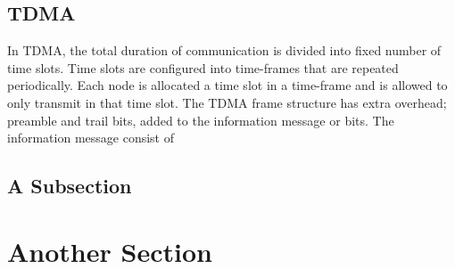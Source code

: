 \subsection{TDMA}
In TDMA, the total duration of communication is divided into fixed number of time slots.
Time slots are configured into time-frames that are repeated periodically.
Each node is allocated a time slot in a time-frame and is allowed to only transmit in that time slot.
The TDMA frame structure has extra overhead; preamble and trail bits, added to the information message or bits.
The information message consist of 
\subsection{A Subsection}

\section{Another Section}
